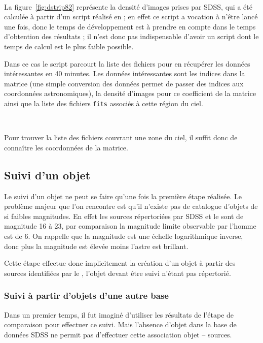 \

La figure~\ref{fig:dstrip82} représente la densité d'images prises par SDSS, qui a été calculée à partir d'un script réalisé en \Python{} ; en effet ce script a vocation à n'être lancé une fois, donc le temps de développement est à prendre en compte dans le temps d'obtention des résultats ; il n'est donc pas indispensable d'avoir un script dont le temps de calcul est le plus faible possible.

Dans ce cas le script parcourt la liste des fichiers pour en récupérer les données intéressantes en 40 minutes. Les données intéressantes sont les indices dans la matrice (une simple conversion des données permet de passer des indices aux coordonnées astronomiques), la densité d'images pour ce coefficient de la matrice ainsi que la liste des fichiers \texttt{fits} associés à cette région du ciel.

\

Pour trouver la liste des fichiers couvrant une zone du ciel, il suffit donc de connaître les coordonnées de la matrice.


	\subsection{Suivi d'un objet}

Le suivi d'un objet ne peut se faire qu'une fois la première étape réalisée. Le problème majeur que l'on rencontre est qu'il n'existe pas de catalogue d'objets de si faibles magnitudes. En effet les sources répertoriées par SDSS et le \stack{} sont de magnitude 16 à 23, par comparaison la magnitude limite observable par l'homme est de 6. On rappelle que la magnitude est une échelle logarithmique inverse, donc plus la magnitude est élevée moins l'astre est brillant.

Cette étape effectue donc implicitement la création d'un objet à partir des sources identifiées par le \stack{}, l'objet devant être suivi n'étant pas répertorié.

		\subsubsection{Suivi à partir d'objets d'une autre base}

Dans un premier temps, il fut imaginé d'utiliser les résultats de l'étape de comparaison pour effectuer ce suivi. Mais l'absence d'objet dans la base de données SDSS ne permit pas d'effectuer cette association objet -- sources.

